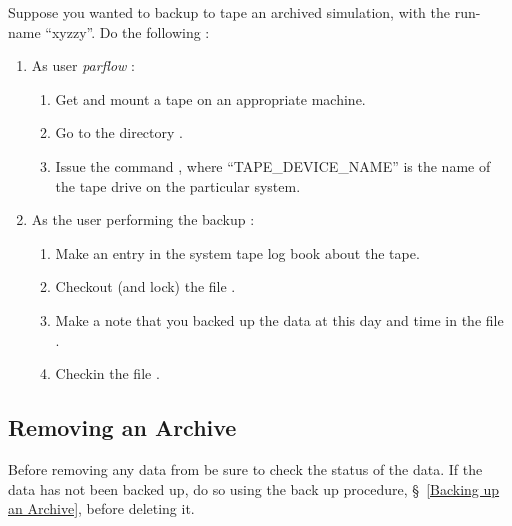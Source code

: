 Suppose you wanted to backup to tape an archived simulation, with
the run-name ``xyzzy''.  Do the following :
\begin{enumerate}
\item As user {\it parflow} :
      \begin{enumerate}
      \item Get and mount a tape on an appropriate machine.
      \item Go to the directory .
      \item Issue the command ,
            where ``TAPE\_DEVICE\_NAME'' is the name of the tape drive on
            the particular system.
      \end{enumerate}
\item As the user performing the backup :
      \begin{enumerate}
      \item Make an entry in the system tape log book about the tape.
      \item Checkout (and lock) the file .
      \item Make a note that you backed up the data at this day and time
            in the file .
      \item Checkin the file .
      \end{enumerate}
\end{enumerate}


\subsection{Removing an Archive}
\label{Removing an Archive}

Before removing any data from  be sure to check
the status of the data.  If the data has not been backed up, do so using
the back up procedure, \S~\ref{Backing up an Archive}, before deleting it.

